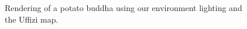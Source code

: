 \begin{figure}
{}
\caption{Rendering of a potato buddha using our environment lighting and the Uffizi map.}
\label{fig:pathbuddhaenv}
\end{figure}

